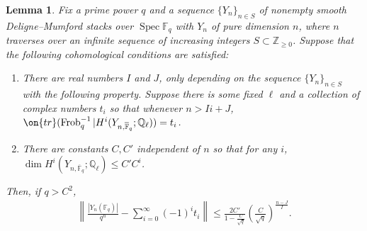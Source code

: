 \documentclass[12 pt]{amsart}
\theoremstyle{plain}
\newtheorem{lemma}[theorem]{Lemma}
\theoremstyle{definition}
\theoremstyle{remark}
\numberwithin{equation}{section}
\DeclareMathOperator\spec{Spec}
\DeclareMathOperator\tr{tr}
\DeclareMathOperator\frob{Frob}
\begin{document}
\begin{lemma}
	\label{lemma:formalization-count}
	Fix a prime power $q$ and a 
	sequence $\{Y_n\}_{n \in S}$ of nonempty smooth Deligne--Mumford
	stacks over $\spec \mathbb F_q$ with
	$Y_n$ of pure dimension $n$, where $n$ traverses over an infinite
	sequence of increasing integers $S \subset \mathbb Z_{\geq 0}$. Suppose that the following cohomological conditions are satisfied:
	\begin{enumerate}
		\item[(1) Stability:]
		There are real numbers $I$ and $J$, only depending on the sequence
		$\{Y_n\}_{n \in S}$ with the following property.
		Suppose there is some fixed $\ell$ and a collection of complex
		numbers
		$t_{i}$ so that
%
		whenever $n > I i + J$, 
		$\on{tr}(\frob_q^{-1} | H^i(Y_{n,\overline{\mathbb F}_q};
		\mathbb Q_{\ell})) = t_i$. 
				\item[(2) Exp. Bound:] There are constants $C,C'$ independent of $n$ so that for any $i$,
			$\dim H^i(Y_{n, \overline{\mathbb F}_q}; \mathbb
		Q_{\ell}) \leq C' C^{i}$.
			\end{enumerate}
	Then, if $q > C^2$,
	\begin{align*}
		\left \|  \frac{\left|Y_n (\mathbb F_q)\right|}{q^n} -
		\sum_{i=0}^\infty (-1)^i t_i 
		\right \| \leq 
		\frac{2C'}{1- \frac{C}{\sqrt{q}}}
		\left(\frac{C}{\sqrt{q}}\right)^{\frac{n-J}{I}}.
	\end{align*}
\end{lemma}
\end{document}
